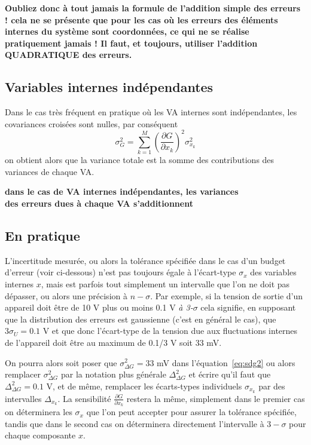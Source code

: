 \documentclass[main.tex]{subfiles}
\begin{document}
\begin{center}
    \bf Oubliez donc à tout jamais la formule de l'addition simple des erreurs ! cela ne se présente que pour les cas où les erreurs des éléments internes du système sont coordonnées, ce qui ne se réalise pratiquement jamais ! Il faut, et toujours, utiliser l'addition QUADRATIQUE des erreurs.
\end{center}

\subsection{Variables internes indépendantes}

Dans le cas très fréquent en pratique où les VA internes sont indépendantes, les covariances croisées sont nulles, par conséquent
\begin{equation}
    \sigma^2_G=\sum\limits_{k=1}^{M}\left(\frac{\partial G}{\partial x_k}\right)^2\sigma_{x_k}^2
    \label{eq:vardlcolvisd}
\end{equation}
on obtient alors que la variance totale est la somme des contributions des variances de chaque VA.
\begin{center}
    \bf
    dans le cas de VA internes indépendantes, les variances\\
    des erreurs dues à chaque VA s'additionnent
\end{center}

\subsection{En pratique}

L'incertitude mesurée, ou alors la tolérance spécifiée dans le cas d'un budget d'erreur (voir ci-dessous) n'est pas toujours égale à l'écart-type $\sigma_x$ des variables internes $x$, mais est parfois tout simplement un intervalle que l'on ne doit pas dépasser, ou alors une précision à $n-\sigma$. Par exemple, si la tension de sortie d'un appareil doit être de 10 V plus ou moins 0.1 V \textit{à 3-$\sigma$} cela signifie, en supposant que la distribution des erreurs est gaussienne (c'est en général le cas), que $3\sigma_U=0.1$ V et que donc l'écart-type de la tension due aux fluctuations internes de l'appareil doit être au maximum de 0.1/3 V soit 33 mV.

On pourra alors soit poser que $\sigma^2_{\Delta G}=33$ mV dans l'équation~\ref{eq:sdg2} ou alors remplacer $\sigma^2_{\Delta G}$ par la notation plus générale $\Delta^2_{\Delta G}$ et écrire qu'il faut que $\Delta^2_{\Delta G}=0.1$ V, et de même, remplacer les écarts-types individuels $\sigma_{x_k}$ par des intervalles $\Delta_{x_k}$. La sensibilité $\frac{\partial G}{\partial x_k}$ restera la même, simplement dans le premier cas on déterminera les $\sigma_x$ que l'on peut accepter pour assurer la tolérance spécifiée, tandis que dans le second cas on déterminera directement l'intervalle à $3-\sigma$ pour chaque composante $x$.
\end{document}
